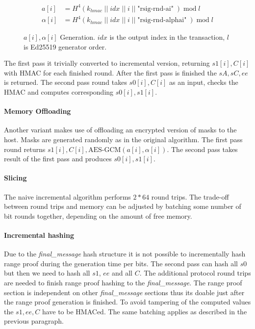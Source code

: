 \documentclass[]{article}
\begin{document}
\begin{figure}[H]

	\begin{equation}
	\begin{split}
	a[i] &= H^4(k_{hmac} \; || \; idx \; || \; i \; || \; \text{"rsig-rnd-ai"} \; ) \; \text{mod} \; l  \\
	\alpha[i] &= H^4(k_{hmac} \; || \; idx \; || \; i \; || \; \text{"rsig-rnd-alphai"} \; ) \; \text{mod} \; l
	\end{split}
	\end{equation}

	\caption{$a[i], \alpha[i]$ Generation. $idx$ is the output index in the transaction, $l$ is Ed25519 generator order.} \label{eq:masks}
\end{figure}

The first pass it trivially converted to incremental version, returning $s1[i], C[i]$ with HMAC for each finished round. 
After the first pass is finished the $sA, sC, ee$ is returned. The second pass round takes $s0[i], C[i]$ as an input, checks the HMAC and computes corresponding $s0[i], s1[i]$.

\paragraph{Memory Offloading}
Another variant makes use of offloading an encrypted version of masks to the host.
Masks are generated randomly as in the original algorithm.
The first pass round returns $s1[i], C[i], \text{AES-GCM}(a[i], \alpha[i])$.
The second pass takes result of the first pass and produces $s0[i], s1[i]$.

\paragraph{Slicing} 
The naive incremental algorithm performs $2 * 64$ round trips. The trade-off between round trips and memory can be adjusted by batching some number of bit rounds together, depending on the amount of free memory. 

\paragraph{Incremental hashing}
Due to the \emph{final\_message} hash structure it is not possible to incrementally hash range proof during the generation time per bits. The second pass can hash all $s0$ but then we need to hash all $s1$, $ee$ and all $C$. The additional protocol round trips are needed to finish range proof hashing to the \emph{final\_message}. The range proof section is independent on other \emph{final\_message} sections thus its doable just after the range proof generation is finished. To avoid tampering of the computed values the $s1, ee, C$ have to be HMACed. The same batching applies as described in the previous paragraph. 
\end{document}

